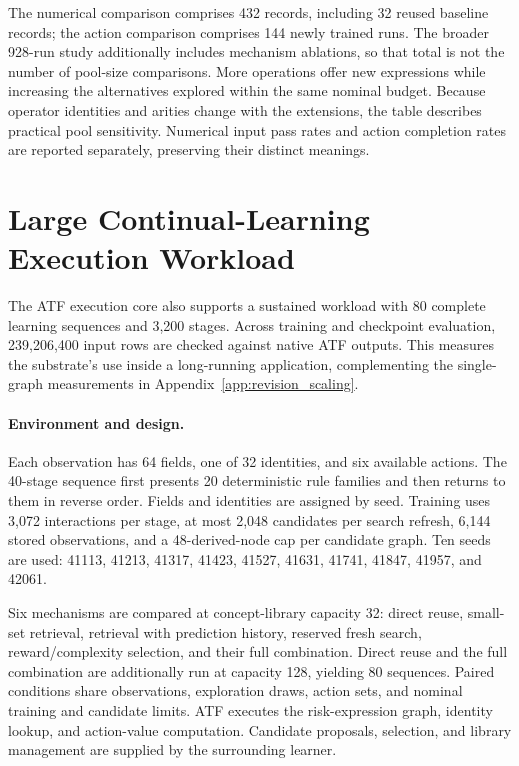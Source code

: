 The numerical comparison comprises 432 records, including 32 reused baseline
records; the action comparison comprises 144 newly trained runs. The broader
928-run study additionally includes mechanism ablations, so that total is not
the number of pool-size comparisons. More operations offer new expressions
while increasing the alternatives explored within the same nominal budget.
Because operator identities and arities change with the extensions, the table
describes practical pool sensitivity. Numerical input pass rates and action
completion rates are reported separately, preserving their distinct meanings.

\section{Large Continual-Learning Execution Workload}
\label{app:revision_large}

The ATF execution core also supports a sustained workload with 80 complete
learning sequences and 3,200 stages. Across training and checkpoint evaluation,
239,206,400 input rows are checked against native ATF outputs. This measures
the substrate's use inside a long-running application, complementing the
single-graph measurements in Appendix~\ref{app:revision_scaling}.

\paragraph{Environment and design.}
Each observation has 64 fields, one of 32 identities, and six available actions.
The 40-stage sequence first presents 20 deterministic rule families and then
returns to them in reverse order. Fields and identities are assigned by seed.
Training uses 3,072 interactions per stage, at most 2,048 candidates per search
refresh, 6,144 stored observations, and a 48-derived-node cap per candidate
graph. Ten seeds are used:
41113, 41213, 41317, 41423, 41527, 41631, 41741, 41847, 41957, and 42061.

Six mechanisms are compared at concept-library capacity 32: direct reuse,
small-set retrieval, retrieval with prediction history, reserved fresh search,
reward/complexity selection, and their full combination. Direct reuse and the
full combination are additionally run at capacity 128, yielding 80 sequences.
Paired conditions share observations, exploration draws, action sets, and
nominal training and candidate limits. ATF executes the risk-expression graph,
identity lookup, and action-value computation. Candidate proposals, selection,
and library management are supplied by the surrounding learner.

